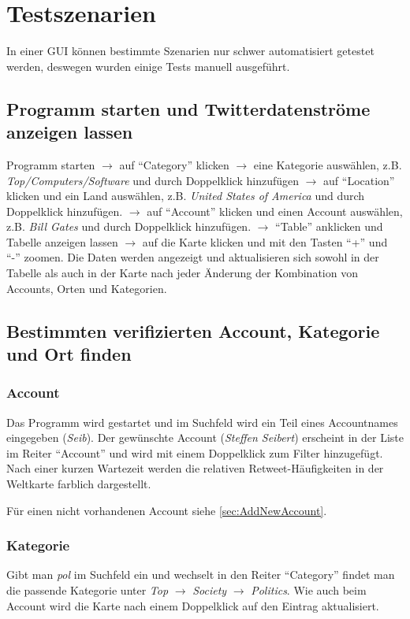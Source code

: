 \section{Testszenarien}

In einer GUI können bestimmte Szenarien nur schwer automatisiert getestet werden, deswegen wurden einige Tests manuell ausgeführt.

\subsection{Programm starten und Twitterdatenströme anzeigen lassen}
Programm starten $\to$ auf "`Category"' klicken $\to$ eine Kategorie auswählen, z.B. \textit{Top/Computers/Software} und durch Doppelklick hinzufügen $\to$ auf "`Location"' klicken und ein Land auswählen, z.B. \textit{United States of America} und durch Doppelklick hinzufügen. $\to$ auf "`Account"' klicken und einen Account auswählen, z.B. \textit{Bill Gates} und durch Doppelklick hinzufügen. $\to$ "`Table"' anklicken und Tabelle anzeigen lassen $\to$ auf die Karte klicken und mit den Tasten "`+"' und "`-"' zoomen.
Die Daten werden angezeigt und aktualisieren sich sowohl in der Tabelle als auch in der Karte nach jeder Änderung der Kombination von Accounts, Orten und Kategorien.
\subsection{Bestimmten verifizierten Account, Kategorie und Ort finden}
\subsubsection{Account}
Das Programm wird gestartet und im Suchfeld wird ein Teil eines Accountnames eingegeben (\textit{Seib}). Der gewünschte Account (\textit{Steffen Seibert}) erscheint in der Liste im Reiter "`Account"' und wird mit einem Doppelklick zum Filter hinzugefügt. Nach einer kurzen Wartezeit werden die relativen Retweet-Häufigkeiten in der Weltkarte farblich dargestellt.

Für einen nicht vorhandenen Account siehe \cref{sec:AddNewAccount}.
\subsubsection{Kategorie}
Gibt man \textit{pol} im Suchfeld ein und wechselt in den Reiter "`Category"' findet man die passende Kategorie unter \textit{Top} $\to$ \textit{Society} $\to$ \textit{Politics}. Wie auch beim Account wird die Karte nach einem Doppelklick auf den Eintrag aktualisiert.
